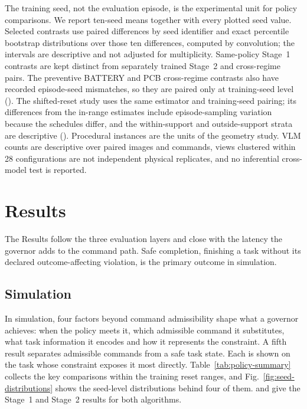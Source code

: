 \documentclass[12pt]{article}
\begin{document}
The training seed, not the evaluation episode, is the experimental unit for
policy comparisons. We report ten-seed means together with every plotted seed
value. Selected contrasts use paired differences by seed identifier and exact
percentile bootstrap distributions over those ten differences, computed by
convolution; the intervals are descriptive and not adjusted for multiplicity.
Same-policy Stage~1 contrasts are kept distinct from separately trained
Stage~2 and cross-regime pairs. The preventive BATTERY and PCB cross-regime
contrasts also have recorded episode-seed mismatches, so they are paired only
at training-seed level (). The shifted-reset study
uses the same estimator and training-seed pairing; its differences from the
in-range estimates include episode-sampling variation because the schedules
differ, and the within-support and outside-support strata are descriptive
(). Procedural instances are the units of the geometry study.
VLM counts are descriptive over paired images and commands, views clustered
within 28 configurations are not independent physical replicates, and no
inferential cross-model test is reported.

\section{Results}

The Results follow the three evaluation layers and close with the latency the
governor adds to the command path. Safe completion, finishing a task without
its declared outcome-affecting violation, is the primary outcome in simulation.

\subsection{Simulation}
\label{sec:sim-results}
In simulation, four factors beyond command admissibility shape what a governor achieves: when the policy meets it, which admissible command it substitutes,
what task information it encodes and how it represents the constraint. A fifth
result separates admissible commands from a safe task state. Each is shown on
the task whose constraint exposes it most directly.
Table~\ref{tab:policy-summary} collects the key comparisons within the training
reset ranges, and Fig.~\ref{fig:seed-distributions} shows the seed-level
distributions behind four of them.  and
 give the Stage~1 and Stage~2 results for both algorithms.
\end{document}
